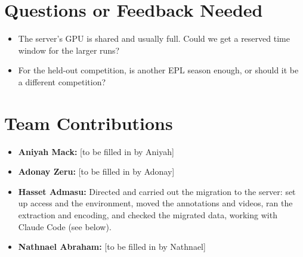 \documentclass[11pt]{article}
\begin{document}
\section*{Questions or Feedback Needed}
\begin{itemize}[noitemsep]
  \item The server's GPU is shared and usually full. Could we get a reserved time window for the larger runs?
  \item For the held-out competition, is another EPL season enough, or should it be a different competition?
\end{itemize}

\section*{Team Contributions}
\begin{itemize}[noitemsep]
  \item \textbf{Aniyah Mack:} [to be filled in by Aniyah]
  \item \textbf{Adonay Zeru:} [to be filled in by Adonay]
  \item \textbf{Hasset Admasu:} Directed and carried out the migration to the server: set up access and the
        environment, moved the annotations and videos, ran the extraction and encoding, and checked the
        migrated data, working with Claude Code (see below).
  \item \textbf{Nathnael Abraham:} [to be filled in by Nathnael]
\end{itemize}
\end{document}
